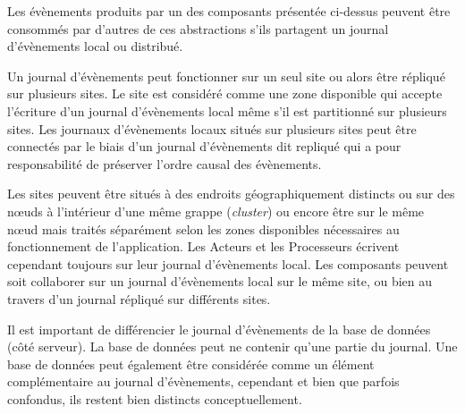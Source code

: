 
Les évènements produits par un des composants présentée ci-dessus
peuvent être consommés par d'autres de ces abstractions s'ils partagent un 
journal d'évènements local ou distribué. 

Un journal d'évènements peut fonctionner sur un seul site ou alors être répliqué sur 
plusieurs sites. Le site est considéré comme une zone disponible qui accepte 
l'écriture d'un journal d'évènements local même s'il est partitionné sur plusieurs 
sites. Les journaux d'évènements locaux situés sur plusieurs sites peut être 
connectés par le biais d'un journal d'évènements dit \og repliqué\fg{} qui a pour 
responsabilité de préserver l'ordre causal des évènements.

Les sites peuvent être situés à des endroits géographiquement distincts ou sur 
des nœuds à l'intérieur d'une même grappe (\textit{cluster}) ou encore être sur le 
même nœud mais traités séparément selon les zones disponibles nécessaires au 
fonctionnement de l'application. Les Acteurs et les Processeurs écrivent 
cependant toujours sur leur journal d'évènements local. Les composants peuvent 
soit collaborer sur un journal d'évènements local sur le même site, ou bien au 
travers d'un journal répliqué sur différents sites.

Il est important de différencier le journal d'évènements de la base de données 
(côté serveur). 
La base de données peut ne contenir qu'une partie du journal. Une base de 
données peut également être considérée comme un élément complémentaire au 
journal d'évènements, cependant et bien que parfois confondus, ils restent bien 
distincts conceptuellement.

